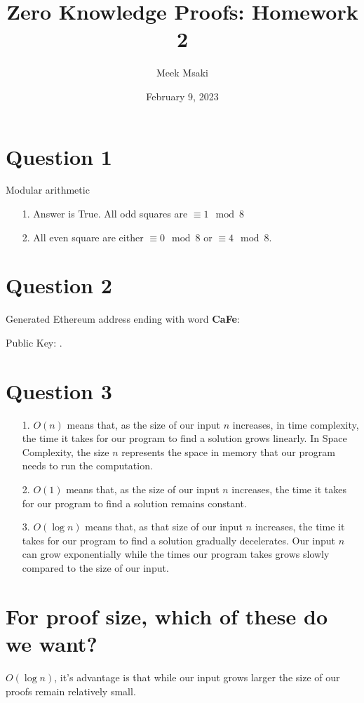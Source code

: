 \documentclass{article}
\title{Zero Knowledge Proofs: Homework 2}
\author{Meek Msaki}
\date{February 9, 2023}
\begin{document}
\maketitle

\section*{Question 1}
Modular arithmetic
\begin{itemize}
    \item [1.]Answer is True. All odd squares are $\equiv1\mod8$ 
    \item [2.]All even square are either $\equiv{0}\mod{8}$ or $\equiv4\mod8$.
\end{itemize}

\section*{Question 2}
Generated Ethereum address ending with word \textbf{CaFe}: 

Public Key: .

\section*{Question 3}
\begin{itemize}
    \item [1.]$O(n)$ means that, as the size of our input $n$ increases, in time complexity, the time it takes for our program to find a solution grows linearly. In Space Complexity, the size $n$ represents the space in memory that our program needs to run the computation.
    \item [2.]$O(1)$ means that, as the size of our input $n$ increases, the time it takes for our program to find a solution remains constant. 
    \item[3.]$O(\log{n})$ means that, as that size of our input $n$ increases, the time it takes for our program to find a solution gradually decelerates. Our input $n$ can grow exponentially while the times our program takes grows slowly compared to the size of our input.  
\end{itemize}

\section*{For proof size, which of these do we want?}
$O(\log{n})$, it's advantage is that while our input grows larger the size of our proofs remain relatively small.
\end{document}
